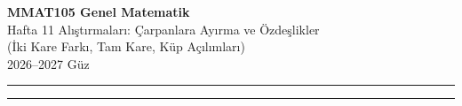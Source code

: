 \documentclass[11pt,a4paper]{article}
\newcounter{alis}
\begin{document}
\begin{minipage}[c]{\textwidth}
{\LARGE\bfseries\color{anamavi} MMAT105 Genel Matematik}\\[4pt]
{\large Hafta 11 Alıştırmaları: Çarpanlara Ayırma ve Özdeşlikler\\ (İki Kare Farkı, Tam Kare, Küp Açılımları)}\\[6pt]
{\small 2026--2027 Güz}
\end{minipage}

\vspace{4pt}\noindent\textcolor{anamavi}{\rule{\textwidth}{1pt}}



\vspace{6pt}
\noindent\textcolor{anamavi}{\rule{\textwidth}{0.5pt}}\\
{\small }
\end{document}
